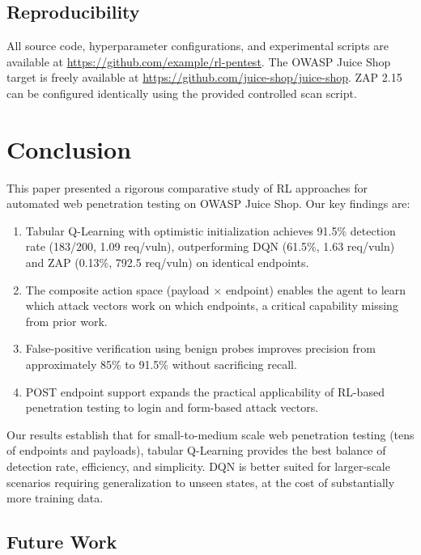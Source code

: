 \documentclass[5p,twocolumn]{elsarticle}
\begin{document}
\subsection{Reproducibility}

All source code, hyperparameter configurations, and experimental scripts are available at \url{https://github.com/example/rl-pentest}. The OWASP Juice Shop target is freely available at \url{https://github.com/juice-shop/juice-shop}. ZAP 2.15 can be configured identically using the provided controlled scan script.

\section{Conclusion}
\label{sec:conclusion}

This paper presented a rigorous comparative study of RL approaches for automated web penetration testing on OWASP Juice Shop. Our key findings are:

\begin{enumerate}
    \item Tabular Q-Learning with optimistic initialization achieves 91.5\% detection rate (183/200, 1.09 req/vuln), outperforming DQN (61.5\%, 1.63 req/vuln) and ZAP (0.13\%, 792.5 req/vuln) on identical endpoints.
    \item The composite action space (payload $\times$ endpoint) enables the agent to learn which attack vectors work on which endpoints, a critical capability missing from prior work.
    \item False-positive verification using benign probes improves precision from approximately 85\% to 91.5\% without sacrificing recall.
    \item POST endpoint support expands the practical applicability of RL-based penetration testing to login and form-based attack vectors.
\end{enumerate}

Our results establish that for small-to-medium scale web penetration testing (tens of endpoints and payloads), tabular Q-Learning provides the best balance of detection rate, efficiency, and simplicity. DQN is better suited for larger-scale scenarios requiring generalization to unseen states, at the cost of substantially more training data.

\subsection*{Future Work}
\end{document}
